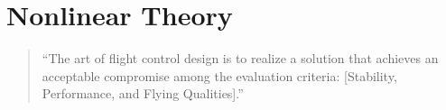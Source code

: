 \documentclass[12pt]{ucthesis}
\begin{document}
%
%
%
%
%
\newpage
\thispagestyle{empty}
\mbox{}
\newpage
\chapter{Nonlinear Theory}
\label{chp: nonlinear_theorey}

	\begin{quotation}
	\noindent ``The art of flight control design is to realize a solution that achieves an acceptable compromise among the evaluation criteria: [Stability, Performance, and Flying Qualities].'' 
	\flushright \citet{WL-TR-96-3099} %
	\end{quotation}
\end{document}
